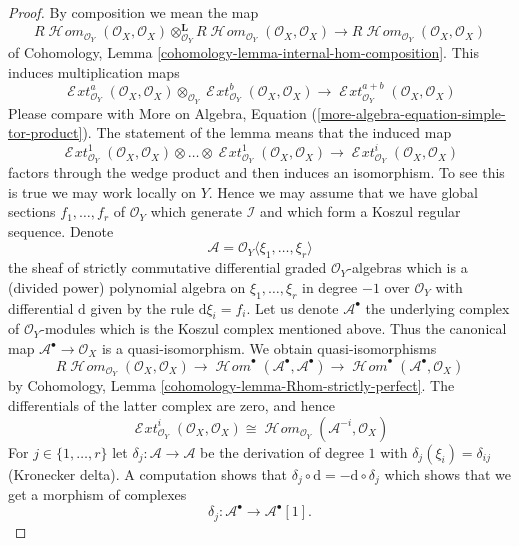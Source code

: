 \documentclass[10pt,a4paper]{amsart}
\theoremstyle{plain}
\theoremstyle{definition}
\theoremstyle{remark}
\numberwithin{equation}{subsection}
\def\SheafHom{\mathop{\mathcal{H}\!\mathit{om}}\nolimits}
\def\SheafExt{\mathop{\mathcal{E}\!\mathit{xt}}\nolimits}
\begin{document}
\begin{proof}
By composition we mean the map
$$
R\SheafHom_{\mathcal{O}_Y}(\mathcal{O}_X, \mathcal{O}_X)
\otimes_{\mathcal{O}_Y}^\mathbf{L}
R\SheafHom_{\mathcal{O}_Y}(\mathcal{O}_X, \mathcal{O}_X)
\longrightarrow
R\SheafHom_{\mathcal{O}_Y}(\mathcal{O}_X, \mathcal{O}_X)
$$
of Cohomology, Lemma \ref{cohomology-lemma-internal-hom-composition}.
This induces multiplication maps
$$
\SheafExt^a_{\mathcal{O}_Y}(\mathcal{O}_X, \mathcal{O}_X)
\otimes_{\mathcal{O}_Y}
\SheafExt^b_{\mathcal{O}_Y}(\mathcal{O}_X, \mathcal{O}_X)
\longrightarrow
\SheafExt^{a + b}_{\mathcal{O}_Y}(\mathcal{O}_X, \mathcal{O}_X)
$$
Please compare with
More on Algebra, Equation (\ref{more-algebra-equation-simple-tor-product}).
The statement of the lemma means that the induced map
$$
\SheafExt^1_{\mathcal{O}_Y}(\mathcal{O}_X, \mathcal{O}_X)
\otimes \ldots \otimes
\SheafExt^1_{\mathcal{O}_Y}(\mathcal{O}_X, \mathcal{O}_X)
\longrightarrow
\SheafExt^i_{\mathcal{O}_Y}(\mathcal{O}_X, \mathcal{O}_X)
$$
factors through the wedge product and then induces an isomorphism.
To see this is true we may work locally on $Y$. Hence we may assume
that we have global sections $f_1, \ldots, f_r$ of $\mathcal{O}_Y$
which generate $\mathcal{I}$ and which form a Koszul regular sequence.
Denote
$$
\mathcal{A} = \mathcal{O}_Y\langle \xi_1, \ldots, \xi_r\rangle
$$
the sheaf of strictly commutative differential graded $\mathcal{O}_Y$-algebras
which is a (divided power) polynomial algebra on
$\xi_1, \ldots, \xi_r$ in degree $-1$ over $\mathcal{O}_Y$
with differential $\text{d}$ given by the rule $\text{d}\xi_i = f_i$.
Let us denote $\mathcal{A}^\bullet$ the underlying
complex of $\mathcal{O}_Y$-modules which is the Koszul complex
mentioned above. Thus the canonical map
$\mathcal{A}^\bullet \to \mathcal{O}_X$
is a quasi-isomorphism. We obtain quasi-isomorphisms
$$
R\SheafHom_{\mathcal{O}_Y}(\mathcal{O}_X, \mathcal{O}_X) \to
\SheafHom^\bullet(\mathcal{A}^\bullet, \mathcal{A}^\bullet) \to
\SheafHom^\bullet(\mathcal{A}^\bullet, \mathcal{O}_X)
$$
by Cohomology, Lemma \ref{cohomology-lemma-Rhom-strictly-perfect}.
The differentials of the latter complex are zero, and hence
$$
\SheafExt^i_{\mathcal{O}_Y}(\mathcal{O}_X, \mathcal{O}_X)
\cong \SheafHom_{\mathcal{O}_Y}(\mathcal{A}^{-i}, \mathcal{O}_X)
$$
For $j \in \{1, \ldots, r\}$ let $\delta_j : \mathcal{A} \to \mathcal{A}$
be the derivation of degree $1$ with $\delta_j(\xi_i) = \delta_{ij}$
(Kronecker delta). A computation shows that
$\delta_j \circ \text{d} = - \text{d} \circ \delta_j$ which shows that
we get a morphism of complexes
$$
\delta_j : \mathcal{A}^\bullet \to \mathcal{A}^\bullet[1].
$$
\end{proof}
\end{document}

